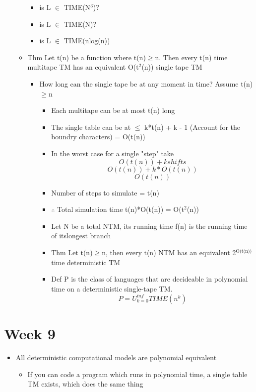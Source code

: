 \documentclass[11pt]{article}
\begin{document}
\begin{itemize}
\begin{itemize}
\begin{itemize}
\item is L \(\in\) TIME(N\(^{\text{3}}\))?
\item is L \(\in\) TIME(N)?
\item is L \(\in\) TIME(nlog(n))
\end{itemize}
\item Thm
Let t(n) be a function where t(n)\(\ge\)n. Then every t(n) time multitape TM has an equivalent O(t\(^{\text{2}}\)(n)) single tape TM
\begin{itemize}
\item How long can the single tape be at any moment in time? Assume t(n)\(\ge\)n
\begin{itemize}
\item Each multitape can be at most t(n) long
\item The single table can be at \(\le\) k*t(n) + k - 1 (Account for the boundry characters) = O(t(n))
\item In the worst case for a single "step" take
\[ O(t(n)) + k shifts \]
\[ O(t(n)) + k*O(t(n)) \]
\[ O(t(n)) \]
\item Number of steps to simulate = t(n)
\item \(\therefore\) Total simulation time t(n)*O(t(n)) = O(t\(^{\text{2}}\)(n))
\item Let N be a total NTM, its running time f(n) is the running time of itslongest branch
\item Thm
Let t(n)\(\ge\)n, then every t(n) NTM has an equivalent 2\(^{\text{O(t(n))}}\) time deterministic TM
\item Def
P is the class of languages that are decideable in polynomial time on a deterministic single-tape TM. 
\[ P = U^{inf}_{k = 0} TIME(n^k) \]
\end{itemize}
\end{itemize}
\end{itemize}
\end{itemize}
\section{Week 9}
\label{sec:orgf59edb8}
\begin{itemize}
\item All deterministic computational models are polynomial equivalent
\begin{itemize}
\item If you can code a program which runs in polynomial time, a single table TM exists, which does the same thing
\end{itemize}
\end{itemize}
\end{document}
